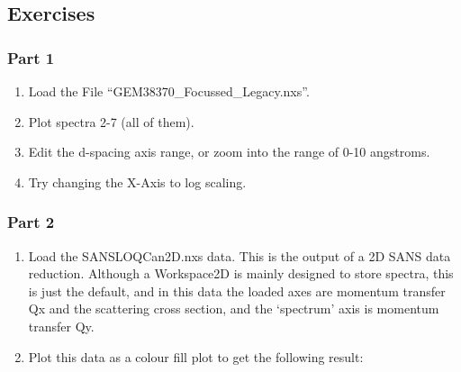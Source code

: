 \documentclass[letterpaper,10pt,english,openany]{sphinxmanual}
\begin{document}
\subsection{Exercises}
\label{\detokenize{mantid_basic_course/loading_and_displaying_data/07_exercises:exercises}}\label{\detokenize{mantid_basic_course/loading_and_displaying_data/07_exercises:id1}}\label{\detokenize{mantid_basic_course/loading_and_displaying_data/07_exercises::doc}}

\subsubsection{Part 1}
\label{\detokenize{mantid_basic_course/loading_and_displaying_data/07_exercises:part-1}}\begin{enumerate}
\def\theenumi{\arabic{enumi}}
\def\labelenumi{\theenumi .}
\makeatletter\def\p@enumii{\p@enumi \theenumi .}\makeatother
\item {} 
Load the File “GEM38370\_Focussed\_Legacy.nxs”.

\item {} 
Plot spectra 2-7 (all of them).

\item {} 
Edit the d-spacing axis range, or zoom into the range of 0-10
angstroms.

\item {} 
Try changing the X-Axis to log scaling.

\end{enumerate}


\subsubsection{Part 2}
\label{\detokenize{mantid_basic_course/loading_and_displaying_data/07_exercises:part-2}}\begin{enumerate}
\def\theenumi{\arabic{enumi}}
\def\labelenumi{\theenumi .}
\makeatletter\def\p@enumii{\p@enumi \theenumi .}\makeatother
\item {} 
Load the SANSLOQCan2D.nxs data. This is the output of a 2D SANS data
reduction. Although a Workspace2D is mainly designed to store
spectra, this is just the default, and in this data the loaded axes
are momentum transfer Qx and the scattering cross section, and the
‘spectrum’ axis is momentum transfer Qy.

\item {} 
Plot this data as a colour fill plot to get the following result:

\end{enumerate}
\end{document}
